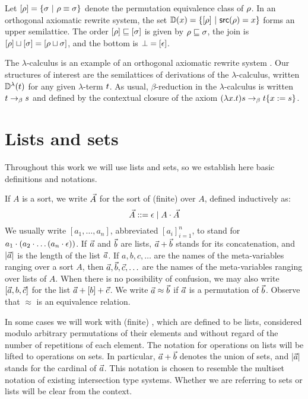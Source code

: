 Let ${[\rho]} = \{\sigma \ |\  \rho \equiv \sigma\}$
denote the permutation equivalence class of $\rho$.
In an orthogonal axiomatic rewrite system,
the set $\mathbb{D}(x) = \{{[\rho]} \ |\  \mathsf{src}(\rho) = x\}$
forms an upper semilattice.
The order ${[\rho]} \sqsubseteq {[\sigma]}$ is given by $\rho \sqsubseteq \sigma$,
the join is ${[\rho]} \sqcup {[\sigma]} = {[\rho \sqcup \sigma]}$,
and the bottom is $\bot = {[\epsilon]}$.

The $\lambda$-calculus is an example of an orthogonal axiomatic rewrite system \cite{thesismellies}.
Our structures of interest are the semilattices of derivations of the $\lambda$-calculus,
written $\mathbb{D}^{\lambda}(t)$ for any given $\lambda$-term $t$.
As usual, $\beta$-reduction in the $\lambda$-calculus
is written $t \mathrel{\to_\beta} s$
and defined by the contextual closure of the axiom $(\lambda x. t)s \mathrel{\to_\beta} t\{x := s\}$.


\section{Lists and sets}

Throughout this work we will use lists and sets, so we establish here basic definitions and notations.

\begin{definition}
If $A$ is a sort, we write $\vec{A}$ for the sort of (finite)  over $A$,
defined inductively as:
\[
  \vec{A} ::= \epsilon \mid A \cdot \vec{A}
  \]
We usually write $[a_1, \hdots, a_n]$,
abbreviated $[a_i]_{i=1}^{n}$,
to stand for $a_1 \cdot (a_2 \cdot \hdots (a_n \cdot \epsilon))$.
If $\vec{a}$ and $\vec{b}$ are lists, $\vec{a} + \vec{b}$ stands for its concatenation,
and $|\vec{a}|$ is the length of the list $\vec{a}$.
If $a,b,c,\hdots$ are the names of the meta-variables ranging over a sort $A$,
then $\vec{a},\vec{b},\vec{c},\hdots$
are the names of the meta-variables ranging over lists of $A$.
When there is no possibility of confusion, we may also write $[\vec{a},b,\vec{c}]$
for the list $\vec{a} + [b] + \vec{c}$.
We write $\vec{a} \approx \vec{b}$ if $\vec{a}$ is a permutation of $\vec{b}$.
Observe that $\approx$ is an equivalence relation.

In some cases we will work with (finite) ,
which are defined to be lists,
considered modulo arbitrary permutations of their elements
and without regard of the number of repetitions of each element.
The notation for operations on lists will be lifted to operations
on sets.
In particular, $\vec{a} + \vec{b}$ denotes the union of sets,
and $|\vec{a}|$ stands for the cardinal of $\vec{a}$.
This notation is chosen to resemble the multiset notation of existing
intersection type systems. Whether we are referring to sets or lists will be
clear from the context.
\end{definition}





